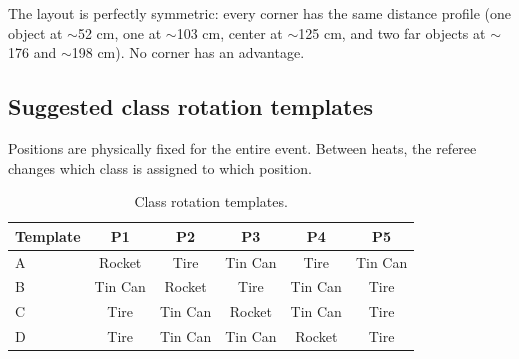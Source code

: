 \documentclass[a4]{article}
\begin{document}
The layout is perfectly symmetric: every corner has the same distance profile (one object at $\sim$52 cm, one at $\sim$103 cm, center at $\sim$125 cm, and two far objects at $\sim$176 and $\sim$198 cm). No corner has an advantage.

\subsection*{Suggested class rotation templates}

Positions are physically fixed for the entire event. Between heats, the referee changes which class is assigned to which position.

\begin{table}[H]
\centering
\begin{tabular}{lccccc}
\toprule
\textbf{Template} & \textbf{P1} & \textbf{P2} & \textbf{P3} & \textbf{P4} & \textbf{P5} \\
\midrule
A & Rocket & Tire & Tin Can & Tire & Tin Can \\
B & Tin Can & Rocket & Tire & Tin Can & Tire \\
C & Tire & Tin Can & Rocket & Tin Can & Tire \\
D & Tire & Tin Can & Tin Can & Rocket & Tire \\
\bottomrule
\end{tabular}
\caption{Class rotation templates.}
\end{table}
\end{document}

